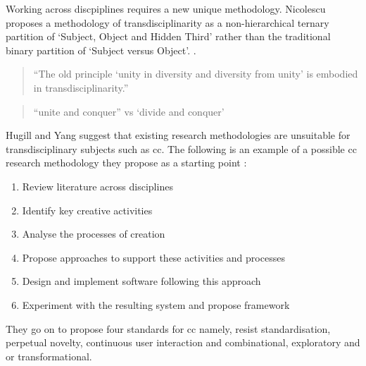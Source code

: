 Working across discpiplines requires a new unique methodology. Nicolescu proposes a methodology of transdisciplinarity as a non-hierarchical ternary partition of `Subject, Object and Hidden Third' rather than the traditional binary partition of `Subject versus Object'. \autocite{Nicolescu2010}.


\begin{quote}
  ``The old principle `unity in diversity and diversity from unity' is embodied in transdisciplinarity.'' \autocite{Nicolescu2010}
\end{quote}

\begin{quote}
  ``unite and conquer'' vs `divide and conquer' \autocite[p.1]{Yang2013}
\end{quote}

\begin{draft}
  Hugill and Yang suggest that existing research methodologies are unsuitable for transdisciplinary subjects such as \gls{cc}. The following is an example of a possible \gls{cc} research methodology they propose as a starting point \autocite[p.17]{Hugill2013c}:

  \begin{enumerate}
    \item Review literature across disciplines
    \item Identify key creative activities
    \item Analyse the processes of creation
    \item Propose approaches to support these activities and processes
    \item Design and implement software following this approach
    \item Experiment with the resulting system and propose framework
  \end{enumerate}

  They go on to propose four standards for \gls{cc} \autocite[p.17]{Hugill2013c} namely, resist standardisation, perpetual novelty, continuous user interaction and combinational, exploratory and or transformational.
\end{draft}



